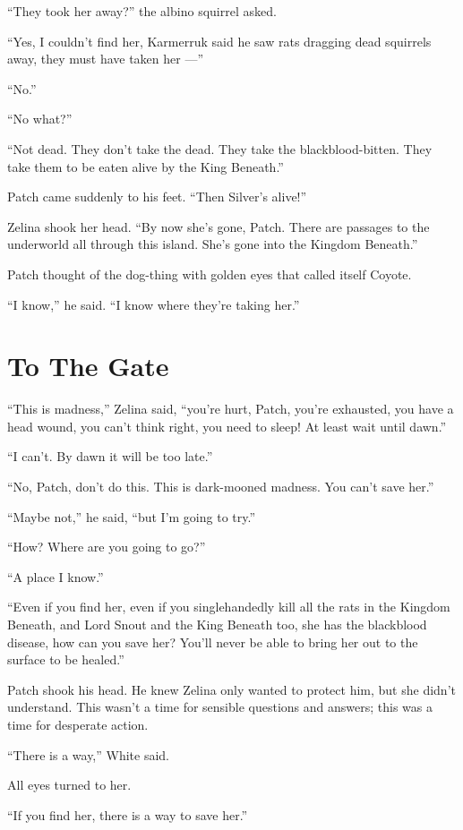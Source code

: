 \documentclass[ebook,oneside,openany,12pt]{memoir}
\begin{document}
“They took her away?” the albino squirrel asked.

“Yes, I couldn’t find her, Karmerruk said he saw rats dragging dead
squirrels away, they must have taken her —”

“No.”

“No what?”

“Not dead. They don’t take the dead. They take the
blackblood-bitten. They take them to be eaten alive by the King
Beneath.”

Patch came suddenly to his feet. “Then Silver’s alive!”

Zelina shook her head. “By now she’s gone, Patch. There are passages
to the underworld all through this island. She’s gone into the Kingdom
Beneath.”

Patch thought of the dog-thing with golden eyes that called itself
Coyote.

“I know,” he said. “I know where they’re taking her.”


\section{To The Gate}

“This is madness,” Zelina said, “you’re hurt, Patch, you’re exhausted,
you have a head wound, you can’t think right, you need to sleep! At
least wait until dawn.”

“I can’t. By dawn it will be too late.”

“No, Patch, don’t do this. This is dark-mooned madness. You can’t save
her.”

“Maybe not,” he said, “but I’m going to try.”

“How? Where are you going to go?”

“A place I know.”

“Even if you find her, even if you singlehandedly kill all the rats in
the Kingdom Beneath, and Lord Snout and the King Beneath too, she has
the blackblood disease, how can you save her? You’ll never be able to
bring her out to the surface to be healed.”

Patch shook his head. He knew Zelina only wanted to protect him, but
she didn’t understand. This wasn’t a time for sensible questions and
answers; this was a time for desperate action.

“There is a way,” White said.

All eyes turned to her.

“If you find her, there is a way to save her.”
\end{document}
